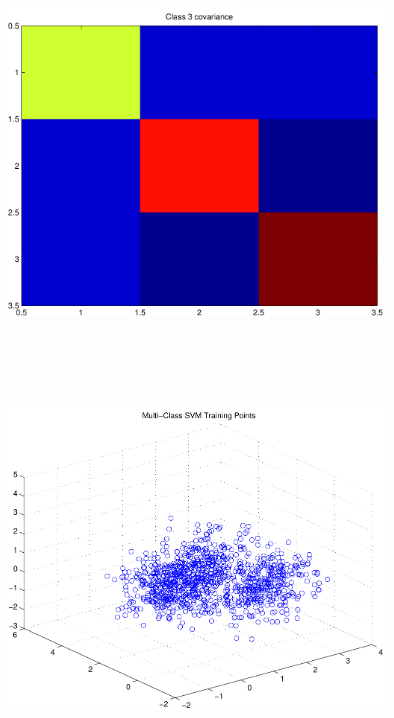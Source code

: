 \documentclass[12pt]{article}
\theoremstyle{definition}
\theoremstyle{remark}
\numberwithin{equation}{section}
\begin{document}
\includegraphics[width=10.0cm,height=10.0cm]{rv3_corr.pdf}

\includegraphics[width=10.0cm,height=10.0cm]{trainingPoints.pdf}
\end{document}
